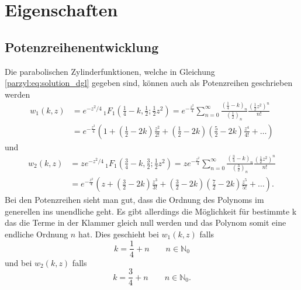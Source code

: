 %
%
%
\section{Eigenschaften
\label{parzyl:section:Eigenschaften}}
\subsection{Potenzreihenentwicklung
	\label{parzyl:potenz}}
Die parabolischen Zylinderfunktionen, welche in Gleichung \ref{parzyl:eq:solution_dgl} gegeben sind, können auch als Potenzreihen geschrieben werden
\begin{align}
	w_1(k,z)
	&=  
	e^{-z^2/4} \,
	{}_{1} F_{1}
	(
	{\textstyle \frac{1}{4}} 
	- k, {\textstyle \frac{1}{2}} ; {\textstyle \frac{1}{2}}z^2) 
	= 
	e^{-\frac{z^2}{4}}
	\sum^{\infty}_{n=0}
	\frac{\left ( \frac{1}{4} - k \right )_{n}}{\left ( \frac{1}{2}\right )_{n}}
	\frac{\left ( \frac{1}{2} z^2\right )^n}{n!} \\
	&=
	e^{-\frac{z^2}{4}}
	\left ( 
	1 
	+
	\left ( \frac{1}{2} - 2k \right )\frac{z^2}{2!}
	+
	\left ( \frac{1}{2} - 2k \right )\left ( \frac{5}{2} - 2k \right )\frac{z^4}{4!}  
	+
	\dots
	\right )
\end{align}
und
\begin{align}
	w_2(k,z)
	&=  
	ze^{-z^2/4} \,
	{}_{1} F_{1}
	(
	{\textstyle \frac{3}{4}} 
	- k, {\textstyle \frac{3}{2}} ; {\textstyle \frac{1}{2}}z^2) 
	= 
	ze^{-\frac{z^2}{4}}
	\sum^{\infty}_{n=0}
	\frac{\left ( \frac{3}{4} - k \right )_{n}}{\left ( \frac{3}{2}\right )_{n}}
	\frac{\left ( \frac{1}{2} z^2\right )^n}{n!} \\
	&=
	e^{-\frac{z^2}{4}}
	\left ( 
	z 
	+
	\left ( \frac{3}{2} - 2k \right )\frac{z^3}{3!}
	+
	\left ( \frac{3}{2} - 2k \right )\left ( \frac{7}{2} - 2k \right )\frac{z^5}{5!}  
	+
	\dots
	\right ).
\end{align}
Bei den Potenzreihen sieht man gut, dass die Ordnung des Polynoms im generellen ins unendliche geht. Es gibt allerdings die Möglichkeit für bestimmte k das die Terme in der Klammer gleich null werden und das Polynom somit eine endliche Ordnung $n$ hat. Dies geschieht bei $w_1(k,z)$ falls
\begin{equation}
	k = \frac{1}{4} + n \qquad n \in \mathbb{N}_0
\end{equation}
und bei $w_2(k,z)$ falls
\begin{equation}
	k = \frac{3}{4} + n \qquad n \in \mathbb{N}_0.
\end{equation}

